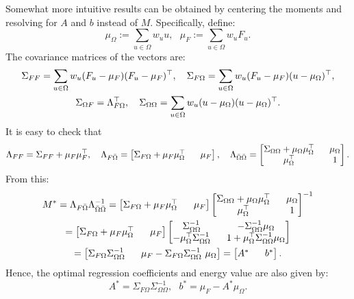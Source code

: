 Somewhat more intuitive results can be obtained by centering the moments and resolving for $A$ and $b$ instead of $M$.
Specifically, define:
$$
\mu_\Omega := \sum_{u\in\Omega} w_u u,~~~
\mu_F := \sum_{u\in\Omega} w_u F_u.
$$
The covariance matrices of the vectors are:
\begin{multline*}
\Sigma_{FF} = \sum_{u \in \Omega} w_u (F_u - \mu_F)(F_u-\mu_F)^\top,~~~
\Sigma_{F \Omega} = \sum_{u \in \Omega} w_u (F_u-\mu_F)(u-\mu_\Omega)^\top,\\
\Sigma_{\Omega F} = \Lambda_{F\Omega}^\top,~~~
\Sigma_{\Omega \Omega} = \sum_{u \in \Omega} w_u (u - \mu_\Omega) (u - \mu_\Omega)^\top.
\end{multline*}
It is easy to check that
\begin{multline*}
\Lambda_{FF} = \Sigma_{FF} + \mu_F\mu_F^\top, ~~~
\Lambda_{F\bar \Omega} = \begin{bmatrix}
\Sigma_{F\Omega} + \mu_F\mu_\Omega^\top &~~ \mu_F
\end{bmatrix}, ~~~
\Lambda_{\bar\Omega \bar \Omega} = \begin{bmatrix}
\Sigma_{\Omega\Omega} + \mu_\Omega\mu_\Omega^\top &~~ \mu_\Omega \\
\mu_\Omega^\top & ~~1
\end{bmatrix}.
\end{multline*}
From this:
\begin{multline*}
M^* 
= \Lambda_{F \bar \Omega} \Lambda_{\bar \Omega \bar \Omega}^{-1} =
\begin{bmatrix}
\Sigma_{F\Omega} + \mu_{F}\mu_{\Omega}^\top & ~~\mu_{F}
\end{bmatrix}
\begin{bmatrix}
\Sigma_{\Omega\Omega} + \mu_{\Omega}\mu_{\Omega}^\top & ~~\mu_{\Omega}\\
\mu_{\Omega}^\top & ~~1 \\
\end{bmatrix}^{-1}
\\
=
\begin{bmatrix}
\Sigma_{F\Omega} + \mu_{F}\mu_{\Omega}^\top & ~~\mu_{F}
\end{bmatrix}
\begin{bmatrix}
\Sigma_{\Omega\Omega}^{-1} & ~~-\Sigma_{\Omega\Omega}^{-1} \mu_{\Omega}\\
- \mu_{\Omega}^\top\Sigma_{\Omega\Omega}^{-1}  & ~~1 + \mu_{\Omega}^\top \Sigma_{\Omega\Omega}^{-1}  \mu_{\Omega}\\
\end{bmatrix}
\\
=
\begin{bmatrix}
\Sigma_{F\Omega} \Sigma_{\Omega\Omega}^{-1} & 
~~\mu_F  - \Sigma_{F\Omega}\Sigma_{\Omega\Omega}^{-1}\ \mu_\Omega
\end{bmatrix}
= \begin{bmatrix} A^* & ~~b^*\end{bmatrix}.
\end{multline*}
Hence, the optimal regression coefficients and energy value are also given by:
$$
A^* = \Sigma_{F\Omega} \Sigma_{\Omega\Omega}^{-1}, ~~~
b^* = \mu_F - A^* \mu_\Omega.$$


